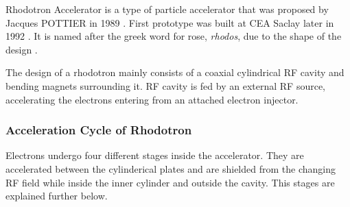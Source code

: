 \documentclass[a4paper,oneside,12pt]{report}
\numberwithin{equation}{chapter}
\begin{document}
Rhodotron Accelerator is a type of particle accelerator that was proposed by Jacques POTTIER in 1989 \cite{rhodo_pottier}. 
First prototype was built at CEA Saclay later in 1992 \cite{rhodo_prototype}. It is named after the greek word for rose, \textit{rhodos}, due to the shape of the design \cite{rhodos}.

The design of a rhodotron mainly consists of a coaxial cylindrical RF cavity and bending magnets surrounding it. RF cavity is fed by an external RF source, accelerating the electrons entering from an attached electron injector.


\subsubsection{Acceleration Cycle of Rhodotron}

Electrons undergo four different stages inside the accelerator. 
They are accelerated between the cylinderical plates and are shielded from the changing RF field while inside the inner cylinder and outside the cavity. 
This stages are explained further below.

\end{document}
